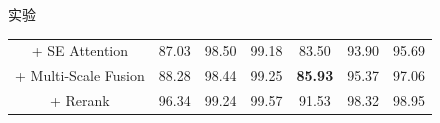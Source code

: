 \documentclass[usenames,dvipsnames,notes]{beamer}
\begin{document}
\begin{frame}{实验}
\begin{table}
{\begin{tabular}{c|ccc|ccc}
				+ SE Attention                             & 87.03                                & 98.50                               & 99.18   & 83.50                        & 93.90   & 95.69   \\
				+ Multi-Scale Fusion                       & {\color{RoyalBlue}  88.28 }          & 98.44                               & 99.25   & {\color{NavyBlue} \bf 85.93} & 95.37   & 97.06   \\
				+ Rerank                                   & {\color{MidnightBlue} 96.34 }        & 99.24                               & 99.57   & 91.53                        & 98.32   & 98.95   \\ \hline
			\end{tabular}
		}
		\label{tab:cuhk03}
	\end{table}

\end{frame}
\end{document}
